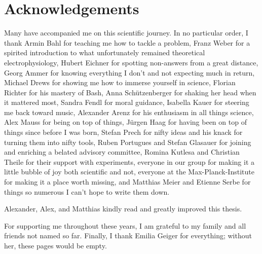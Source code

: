 
\chapter*{Acknowledgements}
\label{chp:ack}



Many have accompanied me on this scientific journey. In no particular order, I thank
Armin Bahl for teaching me how to tackle a problem,
Franz Weber for a spirited introduction to what unfortunately remained theoretical electrophysiology,
Hubert Eichner for spotting non-answers from a great distance,
Georg Ammer for knowing everything I don't and not expecting much in return,
Michael Drews for showing me how to immerse yourself in science,
Florian Richter for his mastery of Bash,
Anna Schützenberger for shaking her head when it mattered most,
Sandra Fendl for moral guidance,
Isabella Kauer for steering me back toward music,
Alexander Arenz for his enthusiasm in all things science,
Alex Mauss for being on top of things,
Jürgen Haag for having been on top of things since before I was born,
Stefan Prech for nifty ideas and his knack for turning them into nifty tools,
Ruben Portugues and Stefan Glasauer for joining and enriching a belated advisory committee,
Romina Kutlesa and Christian Theile for their support with experiments,
everyone in our group for making it a little bubble of joy both scientific and not,
everyone at the Max-Planck-Institute for making it a place worth missing,
and Matthias Meier and Etienne Serbe for things so numerous I can't hope to write them down.

Alexander, Alex, and Matthias kindly read and greatly improved this thesis.

For supporting me throughout these years, I am grateful to my family and all friends not named so far. Finally, I thank Emilia Geiger for everything; without her, these pages would be empty.